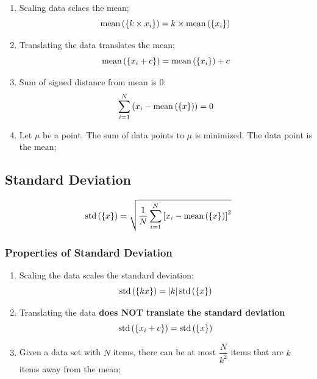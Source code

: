       \begin{enumerate}
        \item Scaling data sclaes the mean;
        \begin{equation}
          \operatorname{mean} \left( \{ k \times x_{i} \} \right) = k \times \operatorname{mean} \left( \{ x_{i} \} \right)
        \end{equation}

        \item Translating the data translates the mean;
        \begin{equation}
          \operatorname{mean} \left( \{ x_{i} + c \} \right) = \operatorname{mean} \left( \{ x_{i} \} \right) + c
        \end{equation}
        
        \item Sum of signed distance from mean is 0:
        \begin{equation}
          \sum_{i = 1}^{N} \left( x_{i} - \operatorname{mean} \left( \{ x \} \right) \right) = 0
        \end{equation}
        
        \item Let $ \mu $ be a point. The sum of data points to $ \mu $ is minimized. The data point is the mean;
      \end{enumerate}

  \subsection{Standard Deviation}
  
    \begin{equation}
      \operatorname{std}\left( \{ x \} \right) = \sqrt{ \frac{1}{N} \sum_{i = 1}^{N} \left[ x_{i} - \operatorname{mean}\left( \{ x \} \right) \right]^{2} }
    \end{equation}
    
    \subsubsection{Properties of Standard Deviation}
    
      \begin{enumerate}
        \item Scaling the data scales the standard deviation:
        \begin{equation}
          \operatorname{std}\left( \{ kx \} \right) = \left| k \right| \operatorname{std}\left( \{ x \} \right)
        \end{equation}
        
        \item Translating the data \textbf{does NOT translate the standard deviation}
        \begin{equation}
          \operatorname{std}\left( \{ x_{i} + c \} \right) = \operatorname{std}\left( \{ x \} \right)
        \end{equation}
        
        \item Given a data set with $ N $ items, there can be at most $ \dfrac{N}{k^{2}} $ items that are $ k $ items away from the mean;
      \end{enumerate}
      
